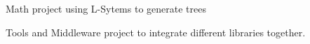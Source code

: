 \documentclass{article}
\begin{document}
\begin{slide}[H]
\centering
{}
	\vspace{-3mm}

	Math project using L-Sytems to generate trees
\endminipage\hfill
{}
	\vspace{-3mm}

	Tools and Middleware project to integrate different libraries together.
\endminipage\hfill
\end{slide}
\end{document}
